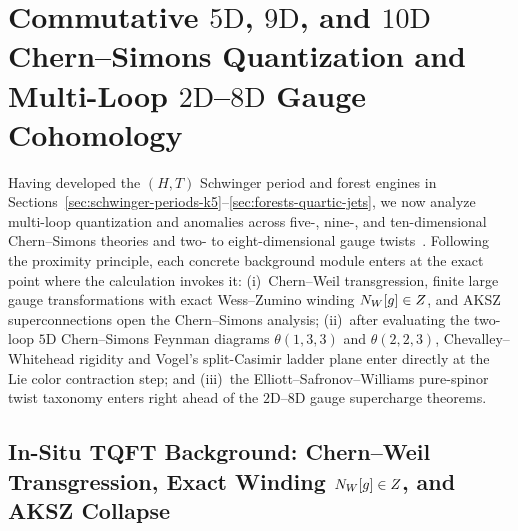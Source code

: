\section{Commutative \texorpdfstring{$5\mathrm{D}$}{5D}, \texorpdfstring{$9\mathrm{D}$}{9D}, and \texorpdfstring{$10\mathrm{D}$}{10D} Chern--Simons Quantization and Multi-Loop \texorpdfstring{$2\mathrm{D}$--$8\mathrm{D}$}{2D--8D} Gauge Cohomology}
\label{sec:cs-gauge-twists}

Having developed the $(H,T)$ Schwinger period and forest engines in Sections~\ref{sec:schwinger-periods-k5}--\ref{sec:forests-quartic-jets}, we now analyze multi-loop quantization and anomalies across five-, nine-, and ten-dimensional Chern--Simons theories and two- to eight-dimensional gauge twists~\cite{Costello16,CDG20,ESW,GKW,Repo9e833c8}. Following the proximity principle, each concrete background module enters at the exact point where the calculation invokes it: (i)~Chern--Weil transgression, finite large gauge transformations with exact Wess--Zumino winding $N_W[g]\in Z$, and AKSZ superconnections open the Chern--Simons analysis; (ii)~after evaluating the two-loop $5\mathrm{D}$ Chern--Simons Feynman diagrams $\theta(1,3,3)$ and $\theta(2,2,3)$, Chevalley--Whitehead rigidity and Vogel's split-Casimir ladder plane enter directly at the Lie color contraction step; and (iii)~the Elliott--Safronov--Williams pure-spinor twist taxonomy enters right ahead of the $2\mathrm{D}$--$8\mathrm{D}$ gauge supercharge theorems.

\subsection{In-Situ TQFT Background: Chern--Weil Transgression, Exact Winding \texorpdfstring{$N_W[g]\in Z$}{N\_W[g] in Z}, and AKSZ Collapse}
\label{subsec:cs-aksz-lecture}


